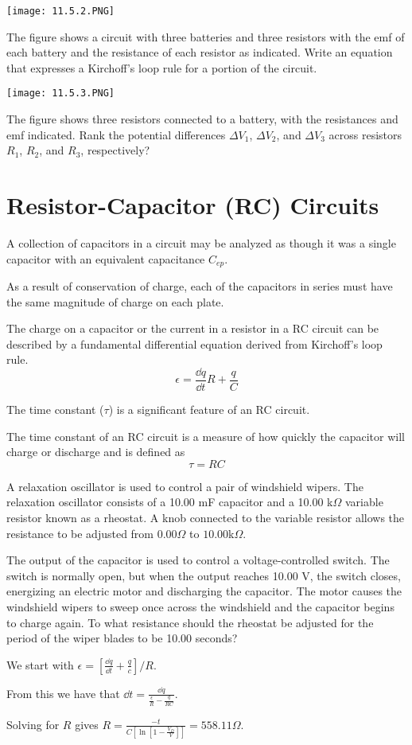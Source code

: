 \documentclass[../em.tex]{subfiles}
\begin{document}
\pagebreak
\ex \begin{center}
    \texttt{[image: 11.5.2.PNG]}
\end{center}
The figure shows a circuit with three batteries and three resistors with the emf of each battery and the resistance of each resistor as indicated. 
Write an equation that expresses a Kirchoff's loop rule for a portion of the circuit.

\ex \begin{center}
    \texttt{[image: 11.5.3.PNG]}
\end{center}
The figure shows three resistors connected to a battery, with the resistances and emf indicated. 
Rank the potential differences $\Delta V_1$, $\Delta V_2$, and $\Delta V_3$ across resistors $R_1$, $R_2$, and $R_3$, respectively?

\section{Resistor-Capacitor (RC) Circuits}
A collection of capacitors in a circuit may be analyzed as though it was a single capacitor with an equivalent capacitance $C_{ep}$.

As a result of conservation of charge, each of the capacitors in series must have the same magnitude of charge on each plate.

The charge on a capacitor or the current in a resistor in a RC circuit can be described by a 
fundamental differential equation derived from Kirchoff's loop rule.
\[ \epsilon = \frac{\dd q}{\dd t}R+\frac{q}{C} \]

The time constant ($\tau$) is a significant feature of an RC circuit.

The time constant of an RC circuit is a measure of how quickly the capacitor will charge or discharge and is defined as 
\[\tau = RC\]

\begin{example}
    A relaxation oscillator is used to control a pair of windshield wipers. The relaxation oscillator consists of a 10.00 mF capacitor and a 10.00 k$\Omega$ variable resistor known as a rheostat.
    A knob connected to the variable resistor allows the resistance to be adjusted from $0.00\Omega$ to $10.00$k$\Omega$. 

    The output of the capacitor is used to control a voltage-controlled switch. The switch is normally open, but when the output reaches 10.00 V, the switch closes, energizing an electric motor and discharging the capacitor. The motor 
    causes the windshield wipers to sweep once across the windshield and the capacitor begins to charge again. To what resistance should the rheostat be adjusted for the period of the wiper blades to be 10.00 seconds?

    We start with $\epsilon = [\frac{\dd q}{\dd t}+\frac{q}{c}]/R$.

    From this we have that $\dd t = \frac{\dd q}{\frac{\epsilon}{R}-\frac{q}{RC}}$.

    Solving for $R$ gives $R=\frac{-t}{C[\ln[1-\frac{V_D}{V}]]}=558.11 \Omega$.
\end{example}
\end{document}
